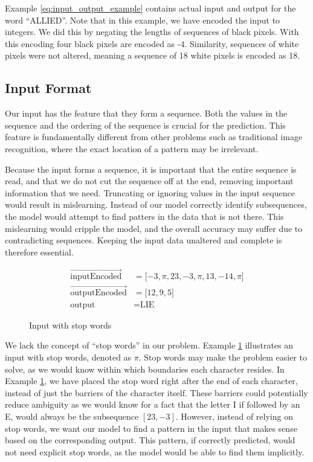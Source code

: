 Example \ref{eq:input_output_example} contains actual input and output for the word ``ALLIED''. Note that in this example, we have encoded the input to integers. We did this by negating the lengths of sequences of black pixels. With this encoding four black pixels are encoded as -4. Similarity, sequences of white pixels were not altered, meaning a sequence of 18 white pixels is encoded as 18.

\subsection{Input Format}
Our input has the feature that they form a sequence. Both the values in the sequence and the ordering of the sequence is crucial for the prediction. This feature is fundamentally different from other problems such as traditional image recognition, where the exact location of a pattern may be irrelevant.

Because the input forms a sequence, it is important that the entire sequence is read, and that we do not cut the sequence off at the end, removing important information that we need. Truncating or ignoring values in the input sequence would result in mislearning. Instead of our model correctly identify subsequences, the model would attempt to find patters in the data that is not there. This mislearning would cripple the model, and the overall accuracy may suffer due to contradicting sequences. Keeping the input data unaltered and complete is therefore essential.

\begin{figure}[ht]
    \renewcommand\figurename{Example}
    \begin{equation*}
        \begin{aligned}
           \vec{\text{inputEncoded}}                &= \lbrack -3, \pi, 23, -3, \pi, 13, -14, \pi \rbrack \\
           \vec{\text{outputEncoded}}               &= \lbrack 12, 9, 5 \rbrack \\
           \text{output}                            &= \text{LIE}
        \end{aligned}
    \end{equation*}
    \caption{Input with stop words}
    \label{eq:input_stop_words}
\end{figure}

We lack the concept of ``stop words'' in our problem. Example \ref{eq:input_stop_words} illustrates an input with stop words, denoted as $\pi$. Stop words may make the problem easier to solve, as we would know within which boundaries each character resides. In Example \ref{eq:input_stop_words}, we have placed the stop word right after the end of each character, instead of just the barriers of the character itself. These barriers could potentially reduce ambiguity as we would know for a fact that the letter I if followed by an E, would always be the subsequence \([23, -3]\). However, instead of relying on stop words, we want our model to find a pattern in the input that makes sense based on the corresponding output. This pattern, if correctly predicted, would not need explicit stop words, as the model would be able to find them implicitly.

